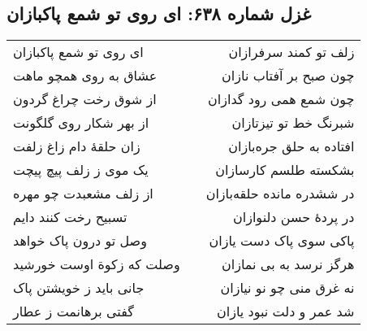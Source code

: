\begin{center}
\section*{غزل شماره ۶۳۸: ای روی تو شمع پاکبازان}
\label{sec:638}
\begin{longtable}{l p{0.5cm} r}
ای روی تو شمع پاکبازان
&&
زلف تو کمند سرفرازان
\\
عشاق به روی همچو ماهت
&&
چون صبح بر آفتاب نازان
\\
از شوق رخت چراغ گردون
&&
چون شمع همی رود گدازان
\\
از بهر شکار روی گلگونت
&&
شبرنگ خط تو تیزتازان
\\
زان حلقهٔ دام زاغ زلفت
&&
افتاده به حلق جره‌بازان
\\
یک موی ز زلف پیچ پیچت
&&
بشکسته طلسم کارسازان
\\
از زلف مشعبدت چو مهره
&&
در ششدره مانده حلقه‌بازان
\\
تسبیح رخت کنند دایم
&&
در پردهٔ حسن دلنوازان
\\
وصل تو درون پاک خواهد
&&
پاکی سوی پاک دست یازان
\\
وصلت که زکوة اوست خورشید
&&
هرگز نرسد به بی نمازان
\\
جانی باید ز خویشتن پاک
&&
نه غرق منی چو نو نیازان
\\
گفتی برهانمت ز عطار
&&
شد عمر و دلت نبود یازان
\\
\end{longtable}
\end{center}
